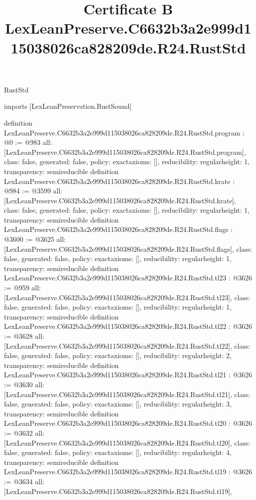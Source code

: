 \begin{lexlean}{RustStd}
\title{Certificate B LexLeanPreserve.C6632b3a2e999d115038026ca828209de.R24.RustStd}
\begin{coremodule}
imports [LexLeanPreservation.RustSound]

definition LexLeanPreserve.C6632b3a2e999d115038026ca828209de.R24.RustStd.program : @0 := @983 {
  all: [LexLeanPreserve.C6632b3a2e999d115038026ca828209de.R24.RustStd.program],
  class: false,
  generated: false,
  policy: exact{axioms: []},
  reducibility: regular{height: 1},
  transparency: semireducible
}
definition LexLeanPreserve.C6632b3a2e999d115038026ca828209de.R24.RustStd.krate : @984 := @3599 {
  all: [LexLeanPreserve.C6632b3a2e999d115038026ca828209de.R24.RustStd.krate],
  class: false,
  generated: false,
  policy: exact{axioms: []},
  reducibility: regular{height: 1},
  transparency: semireducible
}
definition LexLeanPreserve.C6632b3a2e999d115038026ca828209de.R24.RustStd.flags : @3600 := @3625 {
  all: [LexLeanPreserve.C6632b3a2e999d115038026ca828209de.R24.RustStd.flags],
  class: false,
  generated: false,
  policy: exact{axioms: []},
  reducibility: regular{height: 1},
  transparency: semireducible
}
definition LexLeanPreserve.C6632b3a2e999d115038026ca828209de.R24.RustStd.tl23 : @3626 := @959 {
  all: [LexLeanPreserve.C6632b3a2e999d115038026ca828209de.R24.RustStd.tl23],
  class: false,
  generated: false,
  policy: exact{axioms: []},
  reducibility: regular{height: 1},
  transparency: semireducible
}
definition LexLeanPreserve.C6632b3a2e999d115038026ca828209de.R24.RustStd.tl22 : @3626 := @3628 {
  all: [LexLeanPreserve.C6632b3a2e999d115038026ca828209de.R24.RustStd.tl22],
  class: false,
  generated: false,
  policy: exact{axioms: []},
  reducibility: regular{height: 2},
  transparency: semireducible
}
definition LexLeanPreserve.C6632b3a2e999d115038026ca828209de.R24.RustStd.tl21 : @3626 := @3630 {
  all: [LexLeanPreserve.C6632b3a2e999d115038026ca828209de.R24.RustStd.tl21],
  class: false,
  generated: false,
  policy: exact{axioms: []},
  reducibility: regular{height: 3},
  transparency: semireducible
}
definition LexLeanPreserve.C6632b3a2e999d115038026ca828209de.R24.RustStd.tl20 : @3626 := @3632 {
  all: [LexLeanPreserve.C6632b3a2e999d115038026ca828209de.R24.RustStd.tl20],
  class: false,
  generated: false,
  policy: exact{axioms: []},
  reducibility: regular{height: 4},
  transparency: semireducible
}
definition LexLeanPreserve.C6632b3a2e999d115038026ca828209de.R24.RustStd.tl19 : @3626 := @3634 {
  all: [LexLeanPreserve.C6632b3a2e999d115038026ca828209de.R24.RustStd.tl19],
}
\end{coremodule}
\end{lexlean}
